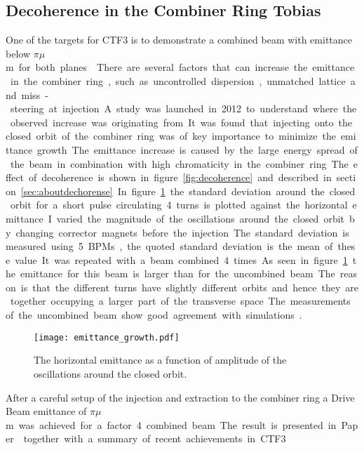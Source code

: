 \subsection{Decoherence in the Combiner Ring \textbf{Tobias}}

One of the targets for CTF3 is to demonstrate a combined beam with emittance
below \unit[150]{$\pi\mu$m} for both planes \cite{roberto_telavi_linac}.
There are several factors that can increase the emittance in the combiner
ring, such as uncontrolled dispersion, unmatched lattice and miss-steering
at injection. A study was launched in 2012 to understand where the observed
increase was originating from. It was found that injecting onto the closed
orbit of the combiner ring was of key importance to minimize the emittance
growth. The emittance increase is caused by the large energy spread of the
beam in combination with high chromaticity in the combiner ring. 
The effect of decoherence is shown in figure~\ref{fig:decoherence} and described in
section~\ref{sec:aboutdechorense}. In figure~\ref{fig:emittance_growth} the
standard deviation around the closed orbit for a short pulse circulating 4
turns is plotted against the horizontal emittance. I varied the magnitude of
the oscillations around the closed orbit by changing corrector magnets
before the injection. The standard deviation is measured using 5 BPMs, the
quoted standard deviation is the mean of these value. It was repeated with a
beam combined 4 times. As seen in figure~\ref{fig:emittance_growth} the
emittance for this beam is larger than for the uncombined beam. 
The reason is that the different turns have slightly different orbits and 
hence they are together occupying a larger part of the transverse space. 
The measurements of the uncombined beam show good agreement with simulations
\cite{clic_workshop_cern_emittance}. 

\begin{figure}[!h]
\begin{center}
\texttt{[image: emittance\_growth.pdf]}
\end{center}
\caption{The horizontal emittance as a function of amplitude of the oscillations around the closed orbit. }
\label{fig:emittance_growth}
\end{figure} 

After a careful setup of the injection and extraction to the combiner ring 
a Drive Beam emittance of \unit[150]{$\pi \mu$m} was achieved for a factor 4 combined beam. 
The result is presented in Paper~\cite{ipac_ctf3_2013} together with a summary of recent achievements in CTF3. 
